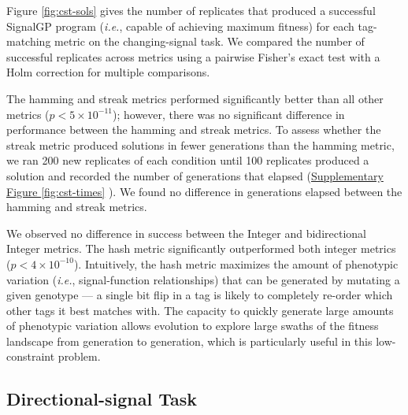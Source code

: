 % 

Figure \ref{fig:cst-sols} gives the number of replicates that produced a successful SignalGP program (\textit{i.e.}, capable of achieving maximum fitness) for each tag-matching metric on the changing-signal task.
We compared the number of successful replicates across metrics using a pairwise Fisher's exact test with a Holm correction for multiple comparisons.

The hamming and streak metrics performed significantly better than all other metrics ($p < 5\times10^{-11}$); however, there was no significant difference in performance between the hamming and streak metrics.
To assess whether the streak metric produced solutions in fewer generations than the hamming metric, we ran 200 new replicates of each condition until 100 replicates produced a solution and recorded the number of generations that elapsed (\href{doi.org/10.17605/OSF.IO/GW5MC}{Supplementary Figure \ref{fig:cst-times}} \citep{Moreno_Ofria_2020}).
We found no difference in generations elapsed between the hamming and streak metrics.

We observed no difference in success between the Integer and bidirectional Integer metrics.
The hash metric significantly outperformed both integer metrics ($p < 4\times10^{-10}$).
Intuitively, the hash metric maximizes the amount of phenotypic variation (\textit{i.e.}, signal-function relationships) that can be generated by mutating a given genotype --- a single bit flip in a tag is likely to completely re-order which other tags it best matches with.
The capacity to quickly generate large amounts of phenotypic variation allows evolution to explore large swaths of the fitness landscape from generation to generation, which is particularly useful in this low-constraint problem.

\subsection{Directional-signal Task}

